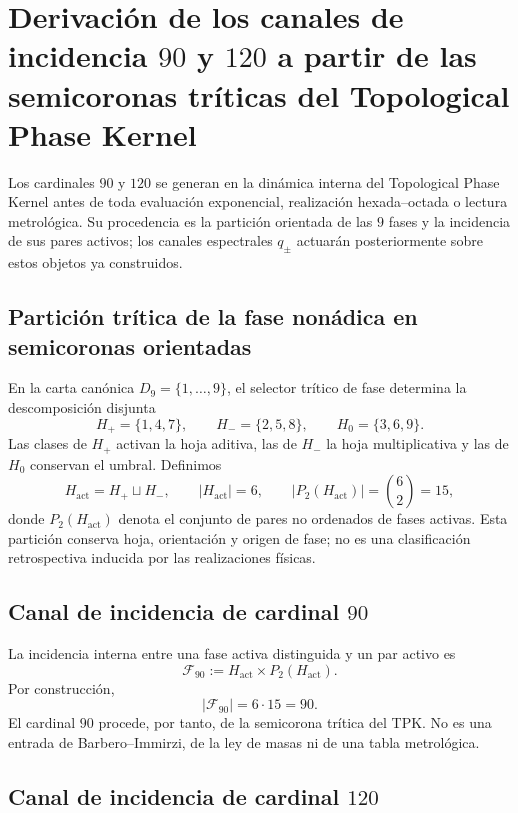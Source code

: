 \section{Derivación de los canales de incidencia \texorpdfstring{\(90\)}{90} y \texorpdfstring{\(120\)}{120} a partir de las semicoronas tríticas del Topological Phase Kernel}
\label{sec:sucesor-102-incidencia-tpk-90-120}

Los cardinales \(90\) y \(120\) se generan en la dinámica interna del
Topological Phase Kernel antes de toda evaluación exponencial, realización
hexada--octada o lectura metrológica. Su procedencia es la partición orientada
de las \(9\) fases y la incidencia de sus pares activos; los canales
espectrales \(q_\pm\) actuarán posteriormente sobre estos objetos ya
construidos.

\subsection{Partición trítica de la fase nonádica en semicoronas orientadas}

En la carta canónica \(D_9=\{1,\ldots,9\}\), el selector trítico de fase
determina la descomposición disjunta
\[
 H_+=\{1,4,7\},\qquad
 H_-=\{2,5,8\},\qquad
 H_0=\{3,6,9\}.
\]
Las clases de \(H_+\) activan la hoja aditiva, las de \(H_-\) la hoja
multiplicativa y las de \(H_0\) conservan el umbral. Definimos
\[
 H_{\mathrm{act}}=H_+\sqcup H_-,
 \qquad |H_{\mathrm{act}}|=6,
 \qquad \bigl|P_2(H_{\mathrm{act}})\bigr|=\binom62=15,
\]
donde \(P_2(H_{\mathrm{act}})\) denota el conjunto de pares no ordenados de
fases activas. Esta partición conserva hoja, orientación y origen de fase; no
es una clasificación retrospectiva inducida por las realizaciones físicas.

\subsection{Canal de incidencia de cardinal \texorpdfstring{\(90\)}{90}}

La incidencia interna entre una fase activa distinguida y un par activo es
\[
 \mathcal F_{90}
 :=H_{\mathrm{act}}\times P_2(H_{\mathrm{act}}).
\]
Por construcción,
\[
 |\mathcal F_{90}|=6\cdot15=90.
\]
El cardinal \(90\) procede, por tanto, de la semicorona trítica del TPK. No
es una entrada de Barbero--Immirzi, de la ley de masas ni de una tabla
metrológica.

\subsection{Canal de incidencia de cardinal \texorpdfstring{\(120\)}{120}}

